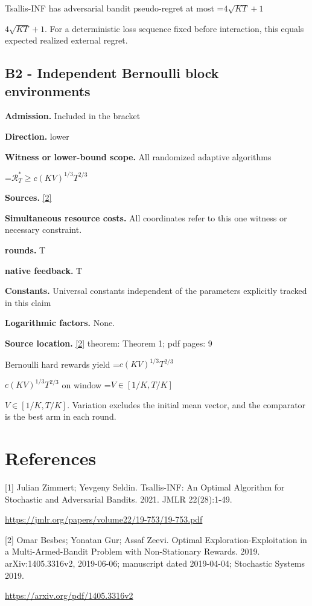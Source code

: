 \documentclass[10pt,a4paper]{article}
\newcommand{\AtlasMath}[1]{\par\begingroup\centering\setbox0=\hbox{$\displaystyle #1$}\ifdim\wd0>1.4\linewidth\typeout{ATLAS WIDE FORMULA: \the\wd0}\fi\ifdim\wd0>\linewidth\resizebox{\linewidth}{!}{\box0}\else\box0\fi\par\endgroup}
\newcommand{\AtlasInlineMath}[1]{\begingroup\setbox0=\hbox{$#1$}\ifdim\wd0>.4\linewidth\endgroup\AtlasMath{#1}\else\endgroup$#1$\fi}
\begin{document}
Tsallis-INF has adversarial bandit pseudo-regret at most \AtlasInlineMath{4\sqrt{KT}+1}. For a deterministic loss sequence fixed before interaction, this equals expected realized external regret.

\subsection{B2 - Independent Bernoulli block environments}
\textbf{Admission.} Included in the bracket

\textbf{Direction.} lower

\textbf{Witness or lower-bound scope.} All randomized adaptive algorithms

\AtlasMath{\mathcal{R}_T^*\ge c(KV)^{1/3}T^{2/3}}
\textbf{Sources.} \href{https://arxiv.org/pdf/1405.3316v2}{[2]}

\textbf{Simultaneous resource costs.} All coordinates refer to this one witness or necessary constraint.

\textbf{rounds.} T

\textbf{native feedback.} T

\textbf{Constants.} Universal constants independent of the parameters explicitly tracked in this claim

\textbf{Logarithmic factors.} None.

\textbf{Source location.} \href{https://arxiv.org/pdf/1405.3316v2}{[2]} theorem: Theorem 1; pdf pages: 9

Bernoulli hard rewards yield \AtlasInlineMath{c(KV)^{1/3}T^{2/3}} on window \AtlasInlineMath{V\in[1/K,T/K]}. Variation excludes the initial mean vector, and the comparator is the best arm in each round.

\section{References}
[1] Julian Zimmert; Yevgeny Seldin. Tsallis-INF: An Optimal Algorithm for Stochastic and Adversarial Bandits. 2021. JMLR 22(28):1-49.

\url{https://jmlr.org/papers/volume22/19-753/19-753.pdf}

[2] Omar Besbes; Yonatan Gur; Assaf Zeevi. Optimal Exploration-Exploitation in a Multi-Armed-Bandit Problem with Non-Stationary Rewards. 2019. arXiv:1405.3316v2, 2019-06-06; manuscript dated 2019-04-04; Stochastic Systems 2019.

\url{https://arxiv.org/pdf/1405.3316v2}
\end{document}
